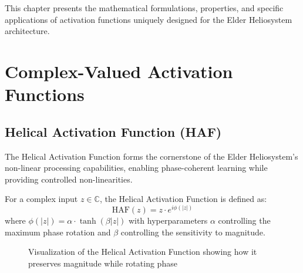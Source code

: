 This chapter presents the mathematical formulations, properties, and specific applications of activation functions uniquely designed for the Elder Heliosystem architecture.

\section{Complex-Valued Activation Functions}

\subsection{Helical Activation Function (HAF)}

The Helical Activation Function forms the cornerstone of the Elder Heliosystem's non-linear processing capabilities, enabling phase-coherent learning while providing controlled non-linearities.

\begin{definition}
For a complex input $z \in \mathbb{C}$, the Helical Activation Function is defined as:
\begin{equation}
\text{HAF}(z) = z \cdot e^{i\phi(|z|)}
\end{equation}
where $\phi(|z|) = \alpha \cdot \tanh(\beta|z|)$ with hyperparameters $\alpha$ controlling the maximum phase rotation and $\beta$ controlling the sensitivity to magnitude.
\end{definition}

\begin{figure}[h]
\centering
{}
\caption{Visualization of the Helical Activation Function showing how it preserves magnitude while rotating phase}
\end{figure}

